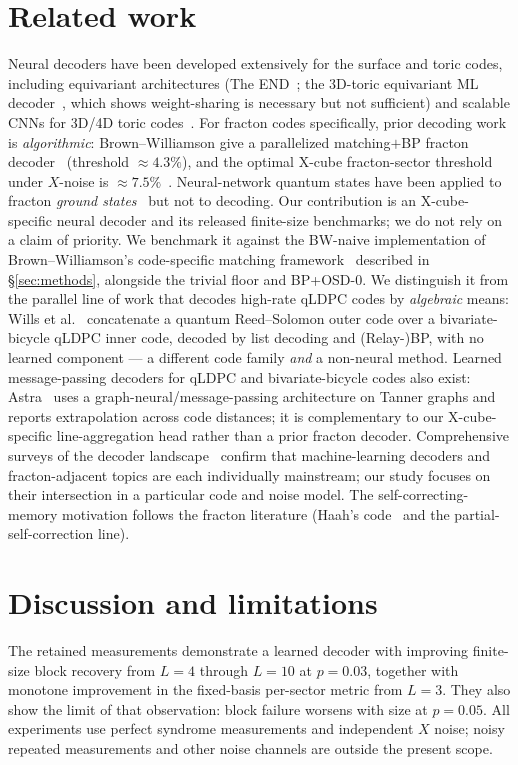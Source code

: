 \documentclass[11pt,a4paper]{article}
\begin{document}
\section{Related work}
\label{sec:related}
Neural decoders have been developed extensively for the surface and toric
codes, including equivariant architectures (The END~\cite{end2023}; the 3D-toric
equivariant ML decoder~\cite{toric3dequiv2024}, which shows weight-sharing is
necessary but not sufficient) and scalable CNNs for 3D/4D toric
codes~\cite{breuckmann2017}. For fracton codes specifically, prior decoding work
is \emph{algorithmic}: Brown--Williamson give a parallelized matching$+$BP
fracton decoder~\cite{brown2019} (threshold $\approx 4.3\%$), and the optimal
X-cube fracton-sector threshold under $X$-noise is
$\approx 7.5\%$~\cite{song2021}. Neural-network quantum states have been applied
to fracton \emph{ground states}~\cite{fracton-nqs2024} but not to decoding.
Our contribution is an X-cube-specific neural decoder and its released
finite-size benchmarks; we do not rely on a claim of priority. We benchmark it against the BW-naive implementation
of Brown--Williamson's code-specific matching framework~\cite{brown2019} described
in \S\ref{sec:methods}, alongside the trivial floor and BP+OSD-0. We distinguish it from the parallel line of work that
decodes high-rate qLDPC codes by \emph{algebraic} means: Wills et
al.~\cite{wills2026concat} concatenate a quantum Reed--Solomon outer code over a
bivariate-bicycle qLDPC inner code, decoded by list decoding and (Relay-)BP, with
no learned component --- a different code family \emph{and} a non-neural method.
Learned message-passing decoders for qLDPC and bivariate-bicycle codes also exist:
Astra~\cite{astra2024} uses a graph-neural/message-passing architecture on Tanner
graphs and reports extrapolation across code distances; it is complementary to
our X-cube-specific line-aggregation head rather than a prior fracton decoder.
Comprehensive surveys of the decoder landscape~\cite{spencer2026tutorial} confirm
that machine-learning decoders and fracton-adjacent topics are each individually
mainstream; our study focuses on their intersection in a particular code and noise model. The
self-correcting-memory motivation follows the fracton literature (Haah's
code~\cite{haah2011} and the partial-self-correction line).

\section{Discussion and limitations}
\label{sec:discussion}
The retained measurements demonstrate a learned decoder with improving
finite-size block recovery from $L=4$ through $L=10$ at $p=0.03$, together
with monotone improvement in the fixed-basis per-sector metric from $L=3$.
They also show the limit of that observation: block failure worsens with
size at $p=0.05$. All experiments use perfect syndrome measurements and
independent $X$ noise; noisy repeated measurements and other noise channels
are outside the present scope.
\end{document}
